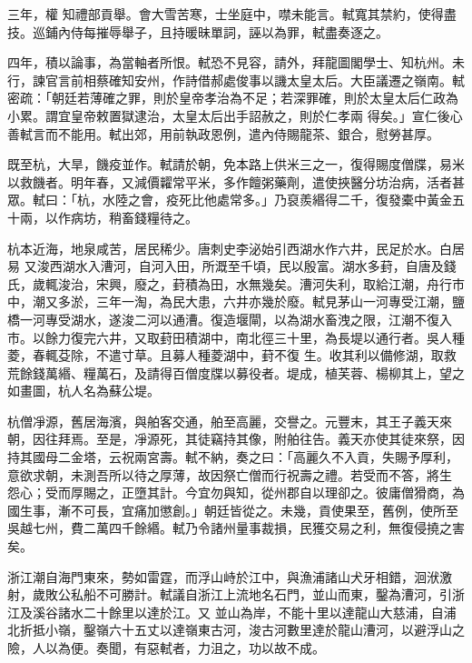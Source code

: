 \begin{pinyinscope}
 三年，權
 知禮部貢舉。會大雪苦寒，士坐庭中，噤未能言。軾寬其禁約，使得盡技。巡鋪內侍每摧辱舉子，且持暖昧單詞，誣以為罪，軾盡奏逐之。



 四年，積以論事，為當軸者所恨。軾恐不見容，請外，拜龍圖閣學士、知杭州。未行，諫官言前相蔡確知安州，作詩借郝處俊事以譏太皇太后。大臣議遷之嶺南。軾密疏：「朝廷若薄確之罪，則於皇帝孝治為不足；若深罪確，則於太皇太后仁政為小累。謂宜皇帝敕置獄逮治，太皇太后出手詔赦之，則於仁孝兩
 得矣。」宣仁後心善軾言而不能用。軾出郊，用前執政恩例，遣內侍賜龍茶、銀合，慰勞甚厚。



 既至杭，大旱，饑疫並作。軾請於朝，免本路上供米三之一，復得賜度僧牒，易米以救饑者。明年春，又減價糶常平米，多作饘粥藥劑，遣使挾醫分坊治病，活者甚眾。軾曰：「杭，水陸之會，疫死比他處常多。」乃裒羨緡得二千，復發橐中黃金五十兩，以作病坊，稍畜錢糧待之。



 杭本近海，地泉咸苦，居民稀少。唐刺史李泌始引西湖水作六井，民足於水。白居易
 又浚西湖水入漕河，自河入田，所溉至千頃，民以殷富。湖水多葑，自唐及錢氏，歲輒浚治，宋興，廢之，葑積為田，水無幾矣。漕河失利，取給江潮，舟行市中，潮又多淤，三年一淘，為民大患，六井亦幾於廢。軾見茅山一河專受江潮，鹽橋一河專受湖水，遂浚二河以通漕。復造堰閘，以為湖水畜洩之限，江潮不復入市。以餘力復完六井，又取葑田積湖中，南北徑三十里，為長堤以通行者。吳人種菱，春輒芟除，不遣寸草。且募人種菱湖中，葑不復
 生。收其利以備修湖，取救荒餘錢萬緡、糧萬石，及請得百僧度牒以募役者。堤成，植芙蓉、楊柳其上，望之如畫圖，杭人名為蘇公堤。



 杭僧凈源，舊居海濱，與舶客交通，舶至高麗，交譽之。元豐末，其王子義天來朝，因往拜焉。至是，凈源死，其徒竊持其像，附舶往告。義天亦使其徒來祭，因持其國母二金塔，云祝兩宮壽。軾不納，奏之曰：「高麗久不入貢，失賜予厚利，意欲求朝，未測吾所以待之厚薄，故因祭亡僧而行祝壽之禮。若受而不答，將生
 怨心；受而厚賜之，正墮其計。今宜勿與知，從州郡自以理卻之。彼庸僧猾商，為國生事，漸不可長，宜痛加懲創。」朝廷皆從之。未幾，貢使果至，舊例，使所至吳越七州，費二萬四千餘緡。軾乃令諸州量事裁損，民獲交易之利，無復侵撓之害矣。



 浙江潮自海門東來，勢如雷霆，而浮山峙於江中，與漁浦諸山犬牙相錯，洄洑激射，歲敗公私船不可勝計。軾議自浙江上流地名石門，並山而東，鑿為漕河，引浙江及溪谷諸水二十餘里以達於江。又
 並山為岸，不能十里以達龍山大慈浦，自浦北折抵小嶺，鑿嶺六十五丈以達嶺東古河，浚古河數里達於龍山漕河，以避浮山之險，人以為便。奏聞，有惡軾者，力沮之，功以故不成。




\end{pinyinscope}
